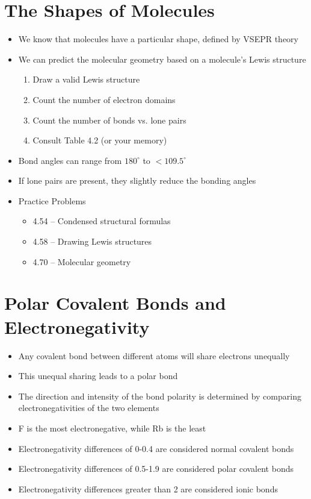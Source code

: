 \documentclass[12pt, openany, letterpaper]{memoir}
\begin{document}
\section{The Shapes of Molecules}
\begin{itemize}
	\item We know that molecules have a particular shape, defined by VSEPR theory
	\item We can predict the molecular geometry based on a molecule's Lewis structure
	\begin{enumerate}
		\item Draw a valid Lewis structure
		\item Count the number of electron domains
		\item Count the number of bonds vs. lone pairs
		\item Consult Table 4.2 (or your memory)
	\end{enumerate}
	\item Bond angles can range from $180^\circ$ to $<109.5^\circ$
	\item If lone pairs are present, they slightly reduce the bonding angles
	\item Practice Problems
	\begin{itemize}
		\item 4.54 -- Condensed structural formulas
		\item 4.58 -- Drawing Lewis structures
		\item 4.70 -- Molecular geometry
	\end{itemize}
\end{itemize}
\section{Polar Covalent Bonds and Electronegativity}
\begin{itemize}
	\item Any covalent bond between different atoms will share electrons unequally
	\item This unequal sharing leads to a polar bond
	\item The direction and intensity of the bond polarity is determined by comparing electronegativities of the two elements
	\item F is the most electronegative, while Rb is the least
	\item Electronegativity differences of 0-0.4 are considered normal covalent bonds
	\item Electronegativity differences of 0.5-1.9 are considered polar covalent bonds
	\item Electronegativity differences greater than 2 are considered ionic bonds
\end{itemize}
\end{document}
